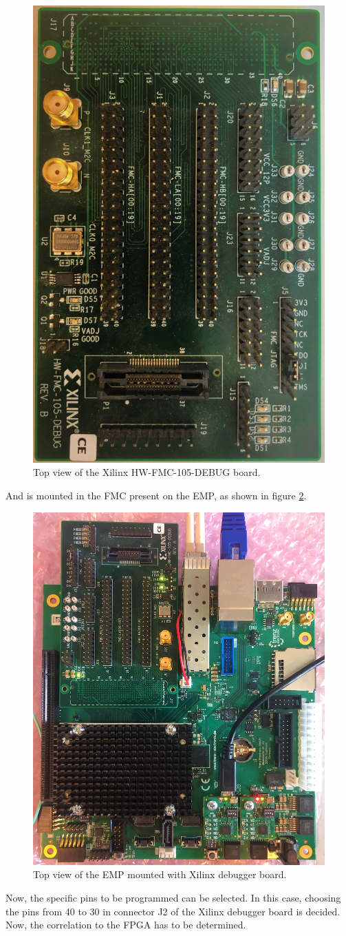 \begin{figure}[H]
    \centering
    \includegraphics[width=.4\textwidth]{Graphics/FMC_top.jpg}
    \caption{Top view of the Xilinx HW-FMC-105-DEBUG board.}
    \label{fig:EMP_with_debug}
\end{figure}

\noindent And is mounted in the FMC present on the EMP, as shown in figure \ref{fig:EMP_with_debug}.

\begin{figure}[H]
    \centering
    \includegraphics[width=.6\textwidth]{Graphics/EMP_with_debug.jpg}
    \caption{Top view of the EMP mounted with Xilinx debugger board.}
    \label{fig:EMP_with_debug}
\end{figure}

\noindent Now, the specific pins to be programmed can be selected. In this case, choosing the pins from 40 to 30 in connector J2 of the Xilinx debugger board is decided. Now, the correlation to the FPGA has to be determined.\\

